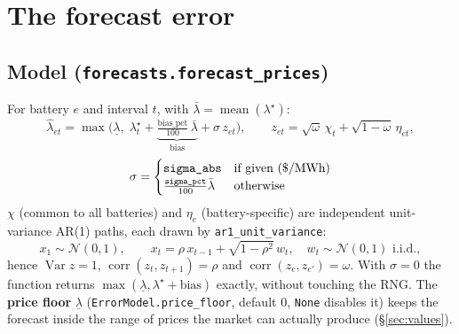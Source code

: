 \documentclass[10pt,a4paper]{article}
\newcommand{\code}[1]{\texttt{#1}}
\newcommand{\lamstar}{\lambda^{\star}}
\newcommand{\lamhat}{\hat\lambda}
\begin{document}
\section{The forecast error}

\subsection{Model (\code{forecasts.forecast\_prices})}
For battery $e$ and interval $t$, with $\bar\lambda=\operatorname{mean}(\lamstar)$:
\[
\lamhat_{et} = \max\Big(\underline\lambda,\; \lamstar_t + \underbrace{\tfrac{\text{bias\_pct}}{100}\,\bar\lambda}_{\text{bias}}
 + \sigma\, z_{et}\Big),\qquad
z_{et} = \sqrt{\omega}\,\chi_t + \sqrt{1-\omega}\,\eta_{et},
\]
\[
\sigma = \begin{cases}\text{\code{sigma\_abs}} & \text{if given (\$/MWh)}\\ \tfrac{\text{\code{sigma\_pct}}}{100}\bar\lambda & \text{otherwise}\end{cases}
\]
$\chi$ (common to all batteries) and $\eta_e$ (battery-specific) are independent unit-variance AR(1)
paths, each drawn by \code{ar1\_unit\_variance}:
\[
x_1\sim\mathcal N(0,1),\qquad x_t=\rho\, x_{t-1}+\sqrt{1-\rho^2}\,w_t,\quad w_t\sim\mathcal N(0,1)\text{ i.i.d.},
\]
hence $\operatorname{Var}z=1$, $\operatorname{corr}(z_t,z_{t+1})=\rho$ and
$\operatorname{corr}(z_{e},z_{e'})=\omega$.
With $\sigma=0$ the function returns $\max(\underline\lambda,\lamstar+\text{bias})$ exactly, without touching
the RNG. The \textbf{price floor} $\underline\lambda$ (\code{ErrorModel.price\_floor}, default 0, \code{None}
disables it) keeps the forecast inside the range of prices the market can actually produce
(\S\ref{sec:values}).

\begin{center}
\end{center}
\end{document}
